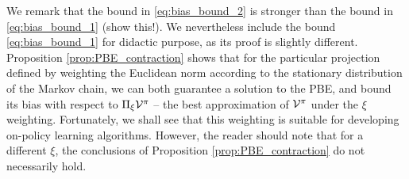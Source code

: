 We remark that the bound in \eqref{eq:bias_bound_2} is stronger than the bound in  \eqref{eq:bias_bound_1} (show this!). We nevertheless include the bound \eqref{eq:bias_bound_1} for didactic purpose, as its proof is slightly different.
Proposition \ref{prop:PBE_contraction} shows that for the particular projection defined by weighting the Euclidean norm according to the stationary distribution of the Markov chain, we can both guarantee a solution to the PBE, and bound its bias with respect to $\Pi_\xi \mathcal{V}^\pi$ -- the best approximation of $\mathcal{V}^\pi$ under the $\xi$ weighting. Fortunately, we shall see that this weighting is suitable for developing on-policy learning algorithms. However, the reader should note that for a different $\xi$, the conclusions of Proposition \ref{prop:PBE_contraction} do not necessarily hold.

